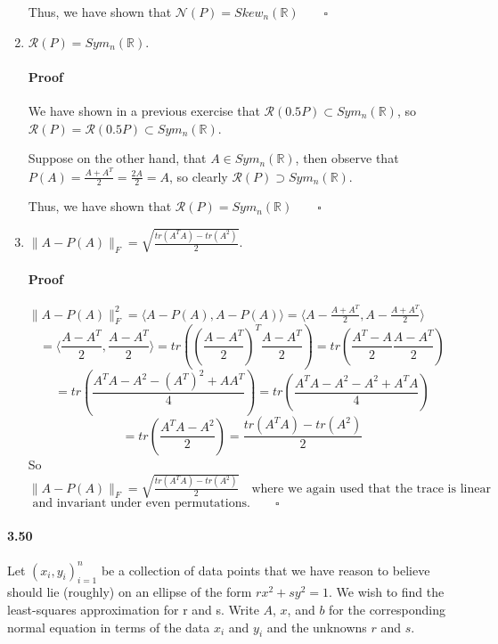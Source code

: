 \documentclass[letterpaper,12pt]{article}
\theoremstyle{definition}
\begin{document}
\begin{enumerate}[label=(\roman*)]
Thus, we have shown that $\mathscr{N}(P) = Skew_n(\mathds{R}) \qquad \square$

\item $\mathscr{R}(P) = Sym_n(\mathds{R})$.

\paragraph{Proof} We have shown in a previous exercise that $\mathscr{R}(0.5P) \subset Sym_n(\mathds{R})$, so $\mathscr{R}(P) = \mathscr{R}(0.5P) \subset Sym_n(\mathds{R})$. 

Suppose on the other hand, that $A \in Sym_n(\mathds{R})$, then observe that $P(A) = \frac{A + A^T}{2} = \frac{2A}{2} = A$, so clearly $\mathscr{R}(P) \supset Sym_n(\mathds{R})$.

Thus, we have shown that $\mathscr{R}(P) = Sym_n(\mathds{R}) \qquad \square$

\item $\| A - P(A) \|_F = \sqrt{\frac{tr(A^TA) - tr(A^2)}{2}}$.

\paragraph{Proof} $\| A - P(A) \|_F^2
= \langle A - P(A), A - P(A) \rangle
= \langle A -  \frac{A + A^T}{2}, A -  \frac{A + A^T}{2} \rangle$
$$= \langle \frac{A - A^T}{2}, \frac{A - A^T}{2} \rangle
= tr((\frac{A - A^T}{2})^T\frac{A - A^T}{2})
= tr(\frac{A^T - A}{2}\frac{A - A^T}{2})$$
$$= tr(\frac{A^TA - A^2 - (A^T)^2 + AA^T}{4})= tr(\frac{A^TA - A^2 - A^2 + A^TA}{4})$$
$$= tr(\frac{A^TA - A^2}{2})
= \frac{tr(A^TA) - tr(A^2)}{2}$$
So $\| A - P(A) \|_F = \sqrt{\frac{tr(A^TA) - tr(A^2)}{2}} \quad \text{where we again used that the trace is linear}$ $\text{ and invariant under even permutations.} \qquad \square$

\end{enumerate}



\paragraph{3.50} Let $(x_i, y_i)_{i = 1}^n$ be a collection of data points that we have reason to believe should lie (roughly) on an ellipse of the form $rx^2 + sy^2 = 1$. We wish to find the least-squares approximation for r and s. Write $A$, $x$, and $b$ for the corresponding normal equation in terms of the data $x_i$ and $y_i$ and the unknowns $r$ and $s$.
\end{document}
